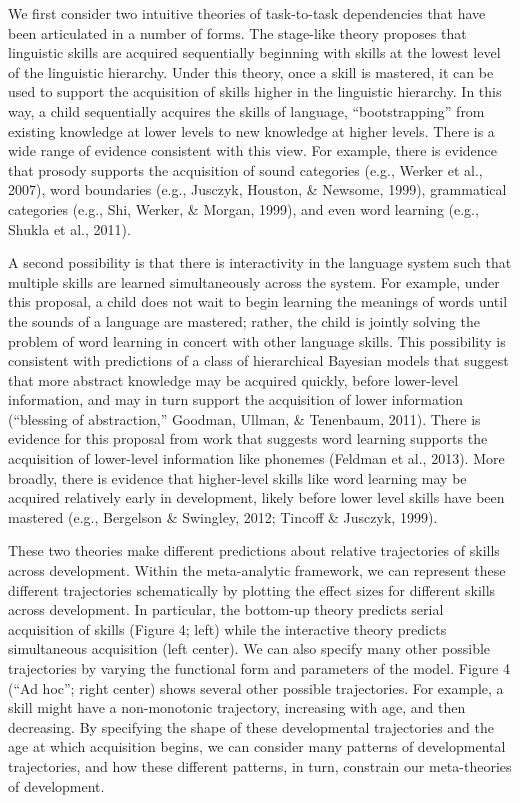 \documentclass[9pt,twocolumn,twoside,lineno]{pnas-new}
\begin{document}
We first consider two intuitive theories of task-to-task dependencies
that have been articulated in a number of forms. The stage-like theory
proposes that linguistic skills are acquired sequentially beginning with
skills at the lowest level of the linguistic hierarchy. Under this
theory, once a skill is mastered, it can be used to support the
acquisition of skills higher in the linguistic hierarchy. In this way, a
child sequentially acquires the skills of language,
\enquote{bootstrapping} from existing knowledge at lower levels to new
knowledge at higher levels. There is a wide range of evidence consistent
with this view. For example, there is evidence that prosody supports the
acquisition of sound categories (e.g., Werker et al., 2007), word
boundaries (e.g., Jusczyk, Houston, \& Newsome, 1999), grammatical
categories (e.g., Shi, Werker, \& Morgan, 1999), and even word learning
(e.g., Shukla et al., 2011).



A second possibility is that there is interactivity in the language
system such that multiple skills are learned simultaneously across the
system. For example, under this proposal, a child does not wait to begin
learning the meanings of words until the sounds of a language are
mastered; rather, the child is jointly solving the problem of word
learning in concert with other language skills. This possibility is
consistent with predictions of a class of hierarchical Bayesian models
that suggest that more abstract knowledge may be acquired quickly,
before lower-level information, and may in turn support the acquisition
of lower information (``blessing of abstraction,'' Goodman, Ullman, \&
Tenenbaum, 2011). There is evidence for this proposal from work that
suggests word learning supports the acquisition of lower-level
information like phonemes (Feldman et al., 2013). More broadly, there is
evidence that higher-level skills like word learning may be acquired
relatively early in development, likely before lower level skills have
been mastered (e.g., Bergelson \& Swingley, 2012; Tincoff \& Jusczyk,
1999).

These two theories make different predictions about relative
trajectories of skills across development. Within the meta-analytic
framework, we can represent these different trajectories schematically
by plotting the effect sizes for different skills across development. In
particular, the bottom-up theory predicts serial acquisition of skills
(Figure 4; left) while the interactive theory predicts simultaneous
acquisition (left center). We can also specify many other possible
trajectories by varying the functional form and parameters of the model.
Figure 4 (\enquote{Ad hoc}; right center) shows several other possible
trajectories. For example, a skill might have a non-monotonic
trajectory, increasing with age, and then decreasing. By specifying the
shape of these developmental trajectories and the age at which
acquisition begins, we can consider many patterns of developmental
trajectories, and how these different patterns, in turn, constrain our
meta-theories of development.
\end{document}

